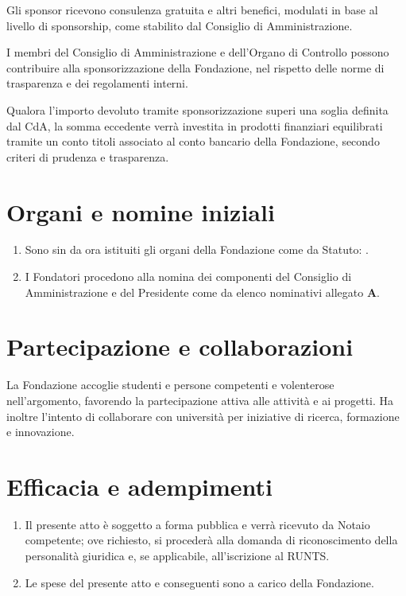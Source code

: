 \documentclass[11pt,a4paper]{article}
\begin{document}
Gli sponsor ricevono consulenza gratuita e altri benefici, modulati in base al livello di sponsorship, come stabilito dal Consiglio di Amministrazione.

I membri del Consiglio di Amministrazione e dell'Organo di Controllo possono contribuire alla sponsorizzazione della Fondazione, nel rispetto delle norme di trasparenza e dei regolamenti interni.

Qualora l'importo devoluto tramite sponsorizzazione superi una soglia definita dal CdA, la somma eccedente verrà investita in prodotti finanziari equilibrati tramite un conto titoli associato al conto bancario della Fondazione, secondo criteri di prudenza e trasparenza.

\section*{Organi e nomine iniziali}
\begin{enumerate}[label=\arabic*)]
  \item Sono sin da ora istituiti gli organi della Fondazione come da Statuto: \OrganiElenco.
  \item I Fondatori procedono alla nomina dei componenti del Consiglio di Amministrazione e del Presidente come da elenco nominativi allegato \textbf{A}.
\end{enumerate}

\section*{Partecipazione e collaborazioni}
La Fondazione accoglie studenti e persone competenti e volenterose nell’argomento, favorendo la partecipazione attiva alle attività e ai progetti. Ha inoltre l’intento di collaborare con università per iniziative di ricerca, formazione e innovazione.

\section*{Efficacia e adempimenti}
\begin{enumerate}[label=\arabic*)]
  \item Il presente atto è soggetto a forma pubblica e verrà ricevuto da Notaio competente; ove richiesto, si procederà alla domanda di riconoscimento della personalità giuridica e, se applicabile, all'iscrizione al RUNTS.
  \item Le spese del presente atto e conseguenti sono a carico della Fondazione.
\end{enumerate}
\end{document}
